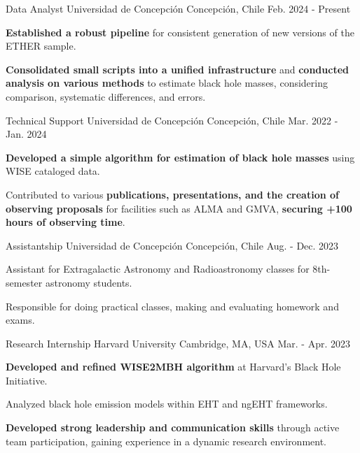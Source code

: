 
\begin{cventries}

  \cventry
    {Data Analyst}
    {Universidad de Concepción}
    {Concepción, Chile}
    {Feb. 2024 - Present}
    {
      \begin{cvitems}
        \item{\textbf{Established a robust pipeline} for consistent generation of new versions of the ETHER sample.}
        \item{\textbf{Consolidated small scripts into a unified infrastructure} and \textbf{conducted analysis on various methods} to estimate black hole masses, considering comparison, systematic differences, and errors.}
      \end{cvitems}
      \vspace{1em}
    }

  \cventry
    {Technical Support}
    {Universidad de Concepción}
    {Concepción, Chile}
    {Mar. 2022 - Jan. 2024}
    {
      \begin{cvitems}
        \item{\textbf{Developed a simple algorithm for estimation of black hole masses} using WISE cataloged data.}
        \item{Contributed to various \textbf{publications, presentations, and the creation of observing proposals} for facilities such as ALMA and GMVA, \textbf{securing +100 hours of observing time}.}
      \end{cvitems}
      \vspace{1em}
    }

  \cventry
    {Assistantship}
    {Universidad de Concepción}
    {Concepción, Chile}
    {Aug. - Dec. 2023}
    {
      \begin{cvitems}
        \item{Assistant for Extragalactic Astronomy and Radioastronomy classes for 8th-semester astronomy students.}
        \item{Responsible for doing practical classes, making and evaluating homework and exams.}
      \end{cvitems}
      \vspace{1em}
    }

  \cventry
    {Research Internship}
    {Harvard University}
    {Cambridge, MA, USA}
    {Mar. - Apr. 2023}
    {
      \begin{cvitems}
        \item{\textbf{Developed and refined WISE2MBH algorithm} at Harvard's Black Hole Initiative.}
        \item{Analyzed black hole emission models within EHT and ngEHT frameworks.}
        \item{\textbf{Developed strong leadership and communication skills} through active team participation, gaining experience in a dynamic research environment.}
      \end{cvitems}
      \vspace{1em}
    }


\end{cventries}
